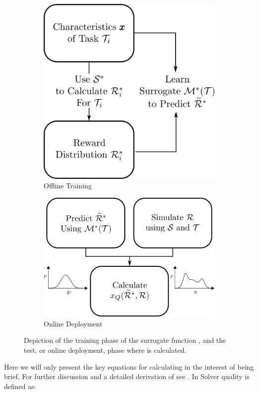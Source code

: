 \begin{figure}[tbp]
    \centering
    \begin{subfigure}[c]{0.50\linewidth}
        \centering
        \includegraphics[width=0.55\linewidth]{Figures/SQ_train.png}
        \vfill
        \caption{Offline Training}
        \label{fig:sq_train}
    \end{subfigure}%
    \hfill
    \begin{subfigure}[c]{0.50\linewidth}
        \centering
        \includegraphics[width=0.75\linewidth]{Figures/SQ_test.png}
        \caption{Online Deployment}
        \label{fig:sq_test}
    \end{subfigure} 
    \caption{Depiction of the training phase of the surrogate function \surrogate, and the test, or online deployment, phase where \xQ{} is calculated.}
    \label{fig:sq_test_train}
\end{figure}

Here we will only present the key equations for calculating \xQ{} in the interest of being brief. For further discussion and a detailed derivation of \xQ{} see \cite{Israelsen2018-qz}. In \cite{Israelsen2018-qz} Solver quality is defined as: 

